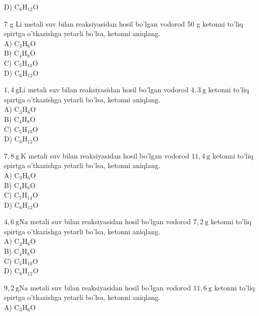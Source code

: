 D) $\mathrm{C}_{6} \mathrm{H}_{12} \mathrm{O}$
  \item 7 g Li metali suv bilan reaksiyasidan hosil bo'lgan vodorod 50 g ketonni to'liq spirtga o'tkazishga yetarli bo'lsa, ketonni aniqlang.\\
A) $\mathrm{C}_{3} \mathrm{H}_{6} \mathrm{O}$\\
B) $\mathrm{C}_{4} \mathrm{H}_{8} \mathrm{O}$\\
C) $\mathrm{C}_{5} \mathrm{H}_{10} \mathrm{O}$\\
D) $\mathrm{C}_{6} \mathrm{H}_{12} \mathrm{O}$
  \item $1,4 \mathrm{~g} \mathrm{Li}$ metali suv bilan reaksiyasidan hosil bo'lgan vodorod $4,3 \mathrm{~g}$ ketonni to'liq spirtga o'tkazishga yetarli bo'lsa, ketonni aniqlang.\\
A) $\mathrm{C}_{3} \mathrm{H}_{6} \mathrm{O}$\\
B) $\mathrm{C}_{4} \mathrm{H}_{8} \mathrm{O}$\\
C) $\mathrm{C}_{5} \mathrm{H}_{10} \mathrm{O}$\\
D) $\mathrm{C}_{6} \mathrm{H}_{12} \mathrm{O}$
  \item $7,8 \mathrm{~g} \mathrm{~K}$ metali suv bilan reaksiyasidan hosil bo'lgan vodorod $11,4 \mathrm{~g}$ ketonni to'liq spirtga o'tkazishga yetarli bo'lsa, ketonni aniqlang.\\
A) $\mathrm{C}_{3} \mathrm{H}_{6} \mathrm{O}$\\
B) $\mathrm{C}_{4} \mathrm{H}_{8} \mathrm{O}$\\
C) $\mathrm{C}_{7} \mathrm{H}_{14} \mathrm{O}$\\
D) $\mathrm{C}_{6} \mathrm{H}_{12} \mathrm{O}$
  \item $4,6 \mathrm{~g} \mathrm{Na}$ metali suv bilan reaksiyasidan hosil bo'lgan vodorod $7,2 \mathrm{~g}$ ketonni to'liq spirtga o'tkazishga yetarli bo'lsa, ketonni aniqlang.\\
A) $\mathrm{C}_{3} \mathrm{H}_{6} \mathrm{O}$\\
B) $\mathrm{C}_{4} \mathrm{H}_{8} \mathrm{O}$\\
C) $\mathrm{C}_{5} \mathrm{H}_{10} \mathrm{O}$\\
D) $\mathrm{C}_{6} \mathrm{H}_{12} \mathrm{O}$
  \item $9,2 \mathrm{~g} \mathrm{Na}$ metali suv bilan reaksiyasidan hosil bo'lgan vodorod $11,6 \mathrm{~g}$ ketonni to'liq spirtga o'tkazishga yetarli bo'lsa, ketonni aniqlang.\\
A) $\mathrm{C}_{3} \mathrm{H}_{6} \mathrm{O}$\\
